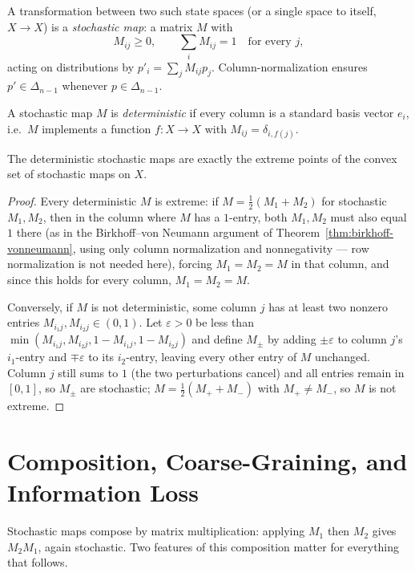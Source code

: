 A transformation between two such state spaces (or a single space to itself,
$X \to X$) is a \emph{stochastic map}: a matrix $M$ with
\begin{equation}
M_{ij} \ge 0, \qquad \sum_i M_{ij} = 1 \quad \text{for every } j,
\end{equation}
acting on distributions by $p'_i = \sum_j M_{ij} p_j$. Column-normalization
ensures $p' \in \Delta_{n-1}$ whenever $p \in \Delta_{n-1}$.

\begin{definition}
A stochastic map $M$ is \emph{deterministic} if every column is a standard
basis vector $e_i$, i.e.\ $M$ implements a function $f: X \to X$ with $M_{ij} =
\delta_{i,f(j)}$.
\end{definition}

\begin{proposition}
The deterministic stochastic maps are exactly the extreme points of the convex
set of stochastic maps on $X$.
\end{proposition}

\begin{proof}
Every deterministic $M$ is extreme: if $M = \tfrac12(M_1+M_2)$ for stochastic
$M_1,M_2$, then in the column where $M$ has a $1$-entry, both $M_1,M_2$ must
also equal $1$ there (as in the Birkhoff--von Neumann argument of
Theorem~\ref{thm:birkhoff-vonneumann}, using only column normalization and
nonnegativity — row normalization is not needed here), forcing $M_1=M_2=M$ in
that column, and since this holds for every column, $M_1=M_2=M$.

Conversely, if $M$ is not deterministic, some column $j$ has at least two
nonzero entries $M_{i_1 j}, M_{i_2 j} \in (0,1)$. Let $\varepsilon>0$ be less
than $\min(M_{i_1j}, M_{i_2j}, 1-M_{i_1j}, 1-M_{i_2j})$ and define $M_\pm$ by
adding $\pm\varepsilon$ to column $j$'s $i_1$-entry and $\mp\varepsilon$ to its
$i_2$-entry, leaving every other entry of $M$ unchanged. Column $j$ still sums
to $1$ (the two perturbations cancel) and all entries remain in $[0,1]$, so
$M_\pm$ are stochastic; $M = \tfrac12(M_++M_-)$ with $M_+ \neq M_-$, so $M$ is
not extreme.
\end{proof}

\section{Composition, Coarse-Graining, and Information Loss}

Stochastic maps compose by matrix multiplication: applying $M_1$ then $M_2$
gives $M_2 M_1$, again stochastic. Two features of this composition matter
for everything that follows.


